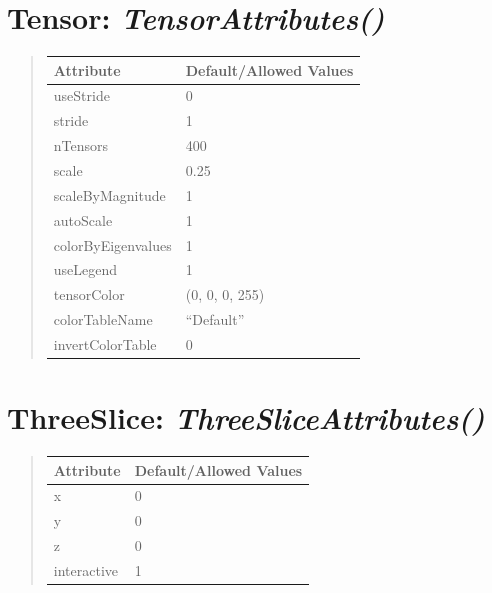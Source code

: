 \documentclass[letterpaper,10pt,english]{sphinxmanual}
\begin{document}
\section{\textbf{Tensor}: \emph{TensorAttributes()}}
\label{attributes:tensor-tensorattributes}
\begin{DUlineblock}{0em}
\item[] 
\end{DUlineblock}
\begin{quote}

\begin{tabulary}{\linewidth}{|L|L|}
\hline

\textbf{Attribute}
 & 
\textbf{Default/Allowed Values}
\\
\hline
useStride
 & 
0
\\
\hline
stride
 & 
1
\\
\hline
nTensors
 & 
400
\\
\hline
scale
 & 
0.25
\\
\hline
scaleByMagnitude
 & 
1
\\
\hline
autoScale
 & 
1
\\
\hline
colorByEigenvalues
 & 
1
\\
\hline
useLegend
 & 
1
\\
\hline
tensorColor
 & 
(0, 0, 0, 255)
\\
\hline
colorTableName
 & 
``Default''
\\
\hline
invertColorTable
 & 
0
\\
\hline\end{tabulary}

\end{quote}

\begin{DUlineblock}{0em}
\item[] 
\end{DUlineblock}

\begin{DUlineblock}{0em}
\item[] 
\end{DUlineblock}


\section{\textbf{ThreeSlice}: \emph{ThreeSliceAttributes()}}
\label{attributes:threeslice-threesliceattributes}
\begin{DUlineblock}{0em}
\item[] 
\end{DUlineblock}
\begin{quote}

\begin{tabulary}{\linewidth}{|L|L|}
\hline

\textbf{Attribute}
 & 
\textbf{Default/Allowed Values}
\\
\hline
x
 & 
0
\\
\hline
y
 & 
0
\\
\hline
z
 & 
0
\\
\hline
interactive
 & 
1
\\
\hline\end{tabulary}

\end{quote}
\end{document}

